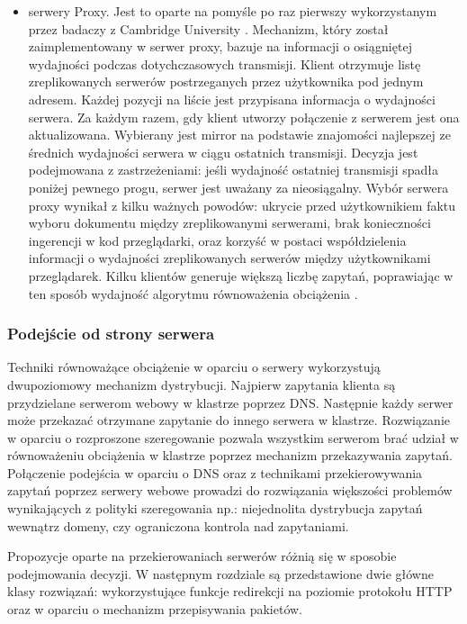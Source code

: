 \begin{itemize}
\item serwery Proxy. Jest to oparte na pomyśle po raz pierwszy wykorzystanym przez badaczy z Cambridge 
University \cite{gliwice20}. Mechanizm, który został zaimplementowany w serwer proxy, bazuje na informacji o 
osiągniętej wydajności podczas dotychczasowych transmisji. Klient otrzymuje listę zreplikowanych serwerów postrzeganych przez
użytkownika pod jednym adresem. Każdej pozycji na liście jest przypisana informacja o wydajności serwera. Za każdym razem, 
gdy klient utworzy połączenie z serwerem jest ona aktualizowana. Wybierany jest mirror na podstawie znajomości
najlepszej ze średnich wydajności serwera w ciągu ostatnich transmisji. Decyzja jest podejmowana z zastrzeżeniami: jeśli 
wydajność ostatniej transmisji spadła poniżej pewnego progu, serwer jest uważany za nieosiągalny. Wybór serwera proxy
wynikał z kilku ważnych powodów: ukrycie przed użytkownikiem faktu wyboru dokumentu między zreplikowanymi serwerami, brak
konieczności ingerencji w kod przeglądarki, oraz korzyść w postaci współdzielenia informacji o wydajności zreplikowanych 
serwerów między użytkownikami przeglądarek. Kilku klientów generuje większą liczbę zapytań, poprawiając w ten sposób wydajność
algorytmu równoważenia obciążenia \cite{gliwice20}. 
\end{itemize}

\subsubsection{Podejście od strony serwera}

Techniki równoważące obciążenie w oparciu o serwery wykorzystują dwupoziomowy mechanizm dystrybucji. Najpierw zapytania
klienta są przydzielane serwerom webowy w klastrze poprzez DNS. Następnie każdy serwer może przekazać otrzymane zapytanie
do innego serwera w klastrze. Rozwiązanie w oparciu o rozproszone szeregowanie pozwala wszystkim serwerom brać udział
w równoważeniu obciążenia w klastrze poprzez mechanizm przekazywania zapytań. Połączenie podejścia w oparciu o DNS oraz z
technikami przekierowywania zapytań poprzez serwery webowe prowadzi do rozwiązania większości problemów wynikających z polityki
szeregowania np.: niejednolita dystrybucja zapytań wewnątrz domeny, czy ograniczona kontrola nad zapytaniami.

Propozycje oparte na przekierowaniach serwerów różnią się w sposobie podejmowania decyzji. W następnym rozdziale są 
przedstawione dwie główne klasy rozwiązań: wykorzystujące funkcje redirekcji na poziomie protokołu HTTP oraz w oparciu o
mechanizm przepisywania pakietów. 

